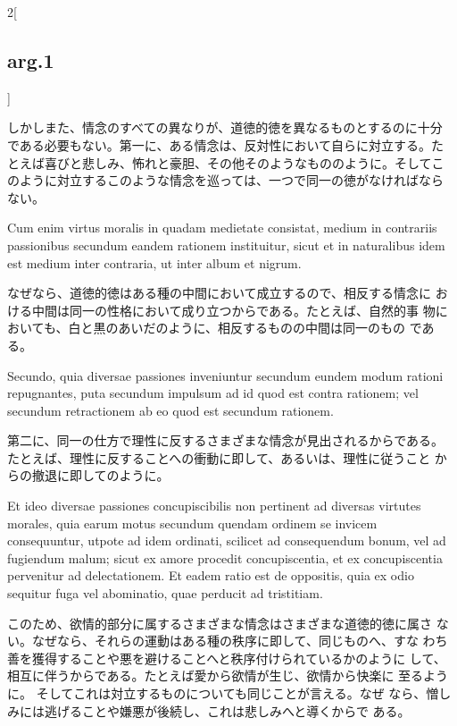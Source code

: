 \documentclass[paper=a4paper,fontsize=10pt,jafontsize=9pt,titlepage]{jlreq}
\begin{document}
\begin{paracol}{2}[\subsection{arg.1}]
\switchcolumn

しかしまた、情念のすべての異なりが、道徳的徳を異なるものとするのに十分
である必要もない。第一に、ある情念は、反対性において自らに対立する。た
とえば喜びと悲しみ、怖れと豪胆、その他そのようなもののように。そしてこ
のように対立するこのような情念を巡っては、一つで同一の徳がなければなら
ない。

\switchcolumn*

Cum enim virtus moralis in quadam medietate consistat,
medium in contrariis passionibus secundum eandem rationem instituitur,
sicut et in naturalibus idem est medium inter contraria, ut inter
album et nigrum.

\switchcolumn

なぜなら、道徳的徳はある種の中間において成立するので、相反する情念に
 おける中間は同一の性格において成り立つからである。たとえば、自然的事
 物においても、白と黒のあいだのように、相反するものの中間は同一のもの
 である。

\switchcolumn*

Secundo, quia diversae passiones inveniuntur secundum eundem modum
 rationi repugnantes, puta secundum impulsum ad id quod est contra
 rationem; vel secundum retractionem ab eo quod est secundum
 rationem.

\switchcolumn

第二に、同一の仕方で理性に反するさまざまな情念が見出されるからである。
 たとえば、理性に反することへの衝動に即して、あるいは、理性に従うこと
 からの撤退に即してのように。

\switchcolumn*

Et ideo diversae passiones concupiscibilis non pertinent ad diversas
 virtutes morales, quia earum motus secundum quendam ordinem se
 invicem consequuntur, utpote ad idem ordinati, scilicet ad
 consequendum bonum, vel ad fugiendum malum; sicut ex amore procedit
 concupiscentia, et ex concupiscentia pervenitur ad delectationem.  Et
 eadem ratio est de oppositis, quia ex odio sequitur fuga vel
 abominatio, quae perducit ad tristitiam.

\switchcolumn

このため、欲情的部分に属するさまざまな情念はさまざまな道徳的徳に属さ
 ない。なぜなら、それらの運動はある種の秩序に即して、同じものへ、すな
 わち善を獲得することや悪を避けることへと秩序付けられているかのように
 して、相互に伴うからである。たとえば愛から欲情が生じ、欲情から快楽に
 至るように。 そしてこれは対立するものについても同じことが言える。なぜ
 なら、憎しみには逃げることや嫌悪が後続し、これは悲しみへと導くからで
 ある。


\end{paracol}
\end{document}
